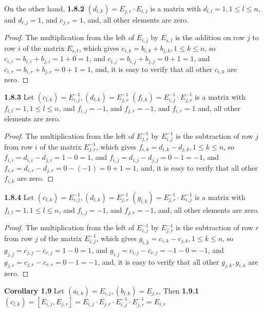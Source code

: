 \documentclass[12pt]{article}
\begin{document}
On the other hand, \newline
\textbf{1.8.2} $(d_{l,k})=E_{j,r} \cdot E_{i,j}$ is a matrix with $d_{l,l}=1,1 \leq l \leq n$, and $d_{i,j}=1$, and $c_{j,r}=1$, and, all other elements are zero.
\begin{proof}
The multiplication from the left of $E_{i,j}$ by $E_{s,t}$ is the addition on row $j$ to row $i$ of the matrix $E_{s,t}$, which gives $c_{i,k}=b_{i,k}+b_{j,k},1 \leq k \leq n$, so $c_{i,i}=b_{i,i}+b_{j,i}=1+0=1$, and $c_{i,j}=b_{i,j}+b_{j,j}=0+1=1$, and $c_{i,r}=b_{i,r}+b_{j,r}=0+1=1$, and, it is easy to verify that all other $c_{i,k}$ are zero. 
\end{proof}
\textbf{1.8.3} 
Let $(c_{l,k})=E_{i,j}^{-1},(d_{l,k})=E_{j,r}^{-1}$ \newline
$(f_{l,k})=E_{i,j}^{-1} \cdot E_{j,r}^{-1}$ is a matrix with $f_{l,l}=1,1 \leq l \leq n$, and $f_{i,j}=-1$, and $f_{j,r}=-1$, and $f_{i,r}=1$ and, all other elements are zero.
\begin{proof}
The multiplication from the left of $E_{j,r}^{-1}$ by $E_{i,j}^{-1}$ is the subtraction of row $j$ from row $i$ of the matrix $E_{j,r}^{-1}$, which gives $f_{i,k}=d_{i,k}-d_{j,k},1 \leq k \leq n$, so $f_{i,i}=d_{i,i}-d_{j,i}=1-0=1$, and $f_{i,j}=d_{i,j}-d_{j,j}=0-1=-1$, and $f_{i,r}=d_{i,r}-d_{j,r}=0-(-1)=0+1=1$, and, it is easy to verify that all other $f_{i,k}$ are zero. 
\end{proof}
\textbf{1.8.4} 
Let $(c_{l,k})=E_{i,j}^{-1},(d_{l,k})=E_{j,r}^{-1}$ \newline
$(g_{l,k})=E_{j,r}^{-1} \cdot E_{i,j}^{-1}$ is a matrix with $f_{l,l}=1,1 \leq l \leq n$, and $f_{i,j}=-1$, and $f_{j,r}=-1$, and, all other elements are zero.
\begin{proof}
The multiplication from the left of $E_{i,j}^{-1}$ by $E_{j,r}^{-1}$ is the subtraction of row $r$ from row $j$ of the matrix $E_{i,j}^{-1}$, which gives $g_{i,k}=c_{i,k}-c_{j,k},1 \leq k \leq n$, so $g_{j,j}=c_{j,j}-c_{r,j}=1-0=1$, and $g_{i,j}=c_{i,j}-c_{r,j}=-1-0=-1$, and $g_{j,r}=c_{j,r}-c_{r,r}=0-1=-1$, and, it is easy to verify that all other $g_{j,k},g_{i,k}$ are zero. 
\end{proof}
\textbf{Corollary 1.9} 
Let $(a_{l,k})=E_{i,j},(b_{l,k})=E_{j,r}$, Then\newline
\textbf{1.9.1}
$(c_{l,k})=[E_{i,j},E_{j,r}]= E_{i,j} \cdot E_{j,r} \cdot E_{i,j}^{-1} \cdot E_{j,r}^{-1}=E_{i,r}$
\end{document}
